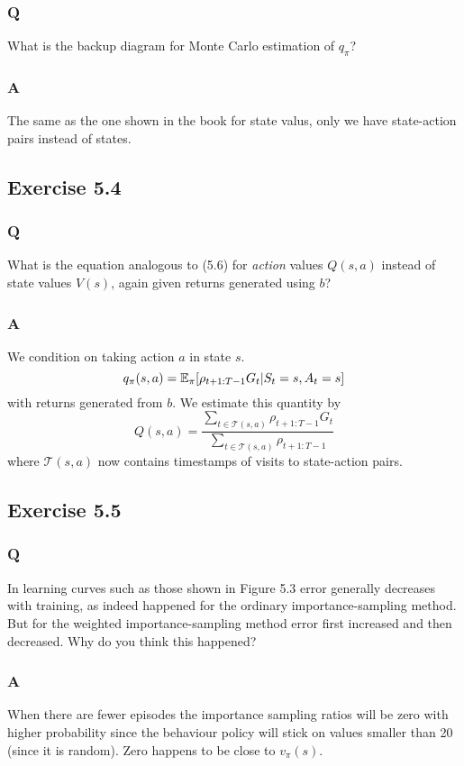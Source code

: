 \subsubsection*{Q}
What is the backup diagram for Monte Carlo estimation of $q_\pi$?

\subsubsection*{A}
The same as the one shown in the book for state valus, only we have state-action pairs instead of states.

\subsection{Exercise 5.4}
\subsubsection*{Q}
What is the equation analogous to (5.6) for \emph{action} values $Q(s, a)$ instead of state values $V(s)$, again given returns generated using $b$?
\subsubsection*{A}
We condition on taking action $a$ in state $s$.
\[
    q_\pi(s, a) = \mathbb{E}_{\pi}{}[\rho_{t+1:T-1} G_t | S_t = s, A_t = s]
\]
with returns generated from $b$. We estimate this quantity by
\[
    Q(s, a) = \frac{\sum_{t \in \mathcal{T}(s, a)} \rho_{t+1:T-1} G_t}{\sum_{t \in \mathcal{T}(s, a)} \rho_{t+1:T-1}}
\]
where $\mathcal{T}(s, a)$ now contains timestamps of visits to state-action pairs.

\subsection{Exercise 5.5}
\subsubsection*{Q}
In learning curves such as those shown in Figure 5.3 error generally decreases with training, as indeed happened for the ordinary importance-sampling method. But for the weighted importance-sampling method error first increased and then decreased. Why do you think this happened?

\subsubsection*{A}
When there are fewer episodes the importance sampling ratios will be zero with higher probability since the behaviour policy will stick on values smaller than 20 (since it is random). Zero happens to be close to $v_\pi(s)$.\\


